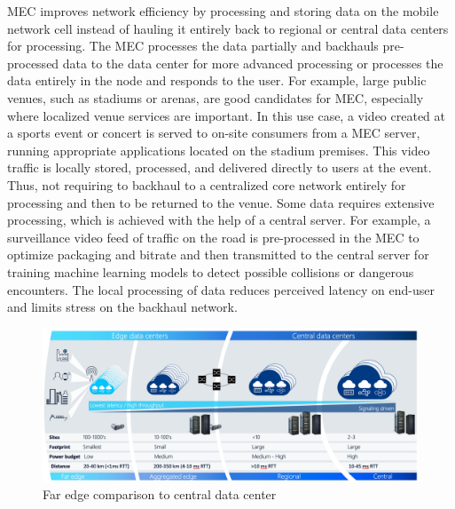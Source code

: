 MEC improves network efficiency by processing and storing data on the mobile network cell instead of hauling it entirely back to regional or central data centers for processing. The MEC processes the data partially and backhauls pre-processed data to the data center for more advanced processing or processes the data entirely in the node and responds to the user. For example, large public venues, such as stadiums or arenas, are good candidates for MEC, especially where localized venue services are important. In this use case, a video created at a sports event or concert is served to on-site consumers from a MEC server, running appropriate applications located on the stadium premises. This video traffic is locally stored, processed, and delivered directly to users at the event. Thus, not requiring to backhaul to a centralized core network entirely for processing and then to be returned to the venue. Some data requires extensive processing, which is achieved with the help of a central server. For example, a surveillance video feed of traffic on the road is pre-processed in the MEC to optimize packaging and bitrate and then transmitted to the central server for training machine learning models to detect possible collisions or dangerous encounters. The local processing of data reduces perceived latency on end-user and limits stress on the backhaul network. \cite{Brown2016}

\begin{figure}[ht]
  \begin{center}
    \includegraphics[width=13.5cm]{images/AirFrame.png}
    \caption{Far edge comparison to central data center \cite{AirFrameOpenEdgeServer}}
    \label{fig:AirFrame}
  \end{center}
\end{figure}

